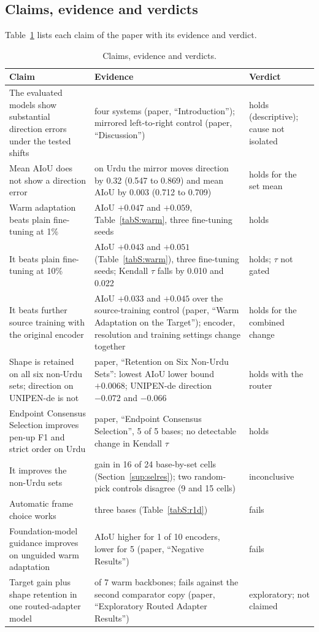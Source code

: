 \documentclass[10pt,a4paper]{article}
\newcommand{\botrule}{\bottomrule}
\newcommand{\ext}[1]{\par\noindent{\small\itshape Extends in the paper: #1.}\par\smallskip}
\begin{document}
\subsection{Claims, evidence and verdicts}\label{sup:claims}
\ext{Discussion}
Table~\ref{tabS:claims} lists each claim of the paper with its evidence and verdict.

\begin{table}[!htbp]
\centering
\caption{Claims, evidence and verdicts.}\label{tabS:claims}
\scriptsize\setlength{\tabcolsep}{3pt}
\begin{tabular}{@{}>{\raggedright\arraybackslash}p{}>{\raggedright\arraybackslash}p{}>{\raggedright\arraybackslash}p{}@{}}
\toprule
Claim & Evidence & Verdict\\
\midrule
The evaluated models show substantial direction errors under the tested shifts & four systems (paper, ``Introduction''); mirrored left-to-right control (paper, ``Discussion'') & holds (descriptive); cause not isolated\\
Mean AIoU does not show a direction error & on Urdu the mirror moves direction by 0.32 (0.547 to 0.869) and mean AIoU by 0.003 (0.712 to 0.709) & holds for the set mean\\
Warm adaptation beats plain fine-tuning at 1\% & AIoU $+0.047$ and $+0.059$, Table~\ref{tabS:warm}, three fine-tuning seeds & holds\\
It beats plain fine-tuning at 10\% & AIoU $+0.043$ and $+0.051$ (Table~\ref{tabS:warm}), three fine-tuning seeds; Kendall $\tau$ falls by 0.010 and 0.022 & holds; $\tau$ not gated\\
It beats further source training with the original encoder & AIoU $+0.033$ and $+0.045$ over the source-training control (paper, ``Warm Adaptation on the Target''); encoder, resolution and training settings change together & holds for the combined change\\
Shape is retained on all six non-Urdu sets; direction on UNIPEN-de is not & paper, ``Retention on Six Non-Urdu Sets'': lowest AIoU lower bound $+0.0068$; UNIPEN-de direction $-0.072$ and $-0.066$ & holds with the router\\
Endpoint Consensus Selection improves pen-up F1 and strict order on Urdu & paper, ``Endpoint Consensus Selection'', 5 of 5 bases; no detectable change in Kendall $\tau$ & holds\\
It improves the non-Urdu sets & gain in 16 of 24 base-by-set cells (Section~\ref{sup:selres}); two random-pick controls disagree (9 and 15 cells) & inconclusive\\
Automatic frame choice works & three bases (Table~\ref{tabS:r1d}) & fails\\
Foundation-model guidance improves on unguided warm adaptation & AIoU higher for 1 of 10 encoders, lower for 5 (paper, ``Negative Results'') & fails\\
Target gain plus shape retention in one routed-adapter model & 1 of 7 warm backbones; fails against the second comparator copy (paper, ``Exploratory Routed Adapter Results'') & exploratory; not claimed\\
\botrule
\end{tabular}
\end{table}

\FloatBarrier



\end{document}
